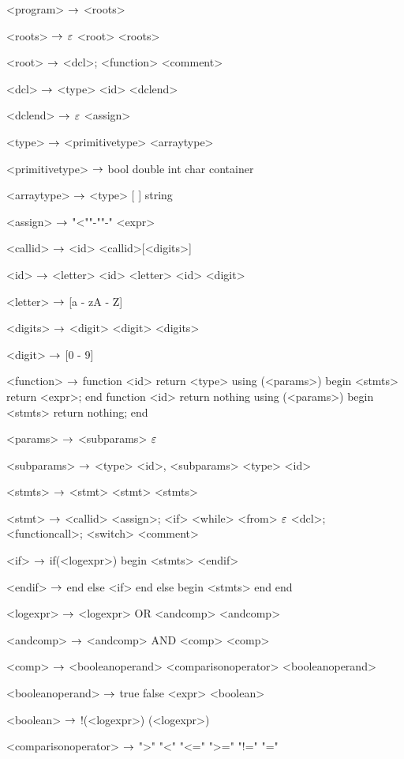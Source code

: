 \begin{grammar}
<program> $\rightarrow$ <roots>

<roots> $\rightarrow$ $\varepsilon$
\alt <root> <roots>

<root> $\rightarrow$ <dcl>;
\alt <function>
\alt <comment>

<dcl> $\rightarrow$ <type> <id> <dclend>

<dclend> $\rightarrow$ $\varepsilon$
\alt <assign> 

<type> $\rightarrow$ <primitivetype>
\alt <arraytype>

<primitivetype> $\rightarrow$ bool
\alt double
\alt int
\alt char
\alt container

<arraytype> $\rightarrow$ <type> [ ]
\alt string

<assign>  $\rightarrow$ "<""-""-" <expr>

<callid> $\rightarrow$ <id>
\alt <callid>[<digits>]

<id> $\rightarrow$ <letter>
	\alt<id> <letter>
	\alt<id> <digit>

<letter> $\rightarrow$ [a - zA - Z]

<digits> $\rightarrow$ <digit>
\alt <digit> <digits>

<digit> $\rightarrow$ [0 - 9]

<function> $\rightarrow$  function <id> return <type> using (<params>)
begin
	<stmts>
	return <expr>;
end
\alt function <id> return nothing using (<params>)
begin
	<stmts>
	return nothing;
end

<params> $\rightarrow$ <subparams>
	\alt $\varepsilon$

<subparams> $\rightarrow$ <type> <id>, <subparams>
\alt <type> <id>

<stmts> $\rightarrow$ <stmt>
	\alt <stmt> <stmts>

<stmt> $\rightarrow$ <callid> <assign>;
	\alt <if>
	\alt <while>
	\alt <from>
	\alt $\varepsilon$
	\alt <dcl>;
	\alt <functioncall>;
	\alt <switch>
	\alt <comment>
	
<if> $\rightarrow$ if(<logexpr>)
	begin
		<stmts>
	<endif>

<endif> $\rightarrow$ end
	else <if>
	\alt end
	else
	begin
		<stmts>
	end
	\alt end
	 
<logexpr> $\rightarrow$ <logexpr> OR <andcomp>
		\alt <andcomp>

<andcomp> $\rightarrow$ <andcomp> AND <comp>

<comp> $\rightarrow$ <booleanoperand> <comparisonoperator> <booleanoperand>

<booleanoperand> $\rightarrow$ true
		\alt false
		\alt <boolean>

<boolean> $\rightarrow$ !(<logexpr>)
		\alt (<logexpr>)

<comparisonoperator> $\rightarrow$ ">"
				\alt "<"
				\alt "<="
				\alt ">="
				\alt "!="
				\alt "="


\end{grammar}
